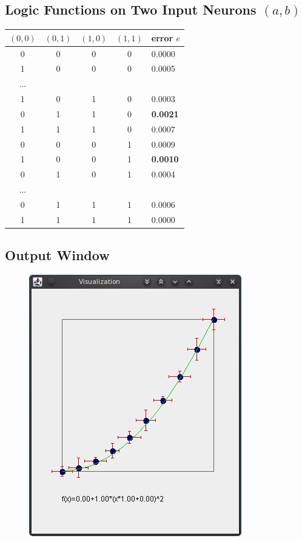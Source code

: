 \documentclass{beamer}
\begin{document}
\subsection{Logic Functions on Two Input Neurons $(a,b)$}
\begin{frame}

  \begin{table}
    \begin{tabular}{|cccc|l|}\hline
      $(0,0)$&$(0,1)$&$(1,0)$&$(1,1)$&error $e$\\
      \hline\hline
      0 & 0 & 0 & 0 & 0.0000\\
      1 & 0 & 0 & 0 & 0.0005\\
      $\ldots$&&&&\\
      1 & 0 & 1 & 0 & 0.0003\\
      0 & 1 & 1 & 0 & {\bf 0.0021}\\
      1 & 1 & 1 & 0 & 0.0007\\
      0 & 0 & 0 & 1 & 0.0009\\
      1 & 0 & 0 & 1 & {\bf 0.0010}\\
      0 & 1 & 0 & 1 & 0.0004\\
      $\ldots$&&&&\\
      0 & 1 & 1 & 1 & 0.0006\\
      1 & 1 & 1 & 1 & 0.0000\\
      \hline
    \end{tabular}
  \end{table}

\end{frame}

\subsection{Output Window}
\begin{frame}
  \begin{figure}
    \centering
    \includegraphics[height=0.8\textheight]{fig/vis.png}
  \end{figure}
\end{frame}
\end{document}

